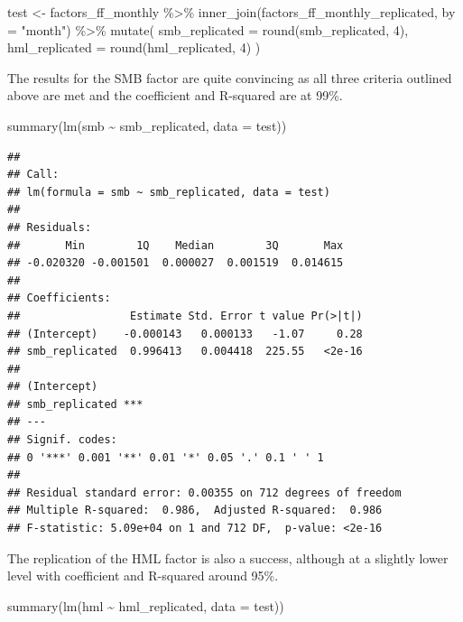 \documentclass[
]{krantz}
\newenvironment{Shaded}{\begin{snugshade}}{\end{snugshade}}
\newcommand{\AttributeTok}[1]{\textcolor[rgb]{0.61,0.61,0.61}{#1}}
\newcommand{\DecValTok}[1]{\textcolor[rgb]{0.06,0.06,0.06}{#1}}
\newcommand{\FunctionTok}[1]{\textcolor[rgb]{0,0,0}{#1}}
\newcommand{\NormalTok}[1]{#1}
\newcommand{\OtherTok}[1]{\textcolor[rgb]{0.37,0.37,0.37}{#1}}
\newcommand{\SpecialCharTok}[1]{\textcolor[rgb]{0,0,0}{#1}}
\newcommand{\StringTok}[1]{\textcolor[rgb]{0.5,0.5,0.5}{#1}}
\begin{document}
\begin{Shaded}
\begin{Highlighting}[]
\NormalTok{test }\OtherTok{\textless{}{-}}\NormalTok{ factors\_ff\_monthly }\SpecialCharTok{\%\textgreater{}\%}
  \FunctionTok{inner\_join}\NormalTok{(factors\_ff\_monthly\_replicated, }\AttributeTok{by =} \StringTok{"month"}\NormalTok{) }\SpecialCharTok{\%\textgreater{}\%}
  \FunctionTok{mutate}\NormalTok{(}
    \AttributeTok{smb\_replicated =} \FunctionTok{round}\NormalTok{(smb\_replicated, }\DecValTok{4}\NormalTok{),}
    \AttributeTok{hml\_replicated =} \FunctionTok{round}\NormalTok{(hml\_replicated, }\DecValTok{4}\NormalTok{)}
\NormalTok{  )}
\end{Highlighting}
\end{Shaded}

The results for the SMB factor are quite convincing as all three criteria outlined above are met and the coefficient and R-squared are at 99\%.

\begin{Shaded}
\begin{Highlighting}[]
\FunctionTok{summary}\NormalTok{(}\FunctionTok{lm}\NormalTok{(smb }\SpecialCharTok{\textasciitilde{}}\NormalTok{ smb\_replicated, }\AttributeTok{data =}\NormalTok{ test))}
\end{Highlighting}
\end{Shaded}

\begin{verbatim}
## 
## Call:
## lm(formula = smb ~ smb_replicated, data = test)
## 
## Residuals:
##       Min        1Q    Median        3Q       Max 
## -0.020320 -0.001501  0.000027  0.001519  0.014615 
## 
## Coefficients:
##                 Estimate Std. Error t value Pr(>|t|)
## (Intercept)    -0.000143   0.000133   -1.07     0.28
## smb_replicated  0.996413   0.004418  225.55   <2e-16
##                   
## (Intercept)       
## smb_replicated ***
## ---
## Signif. codes:  
## 0 '***' 0.001 '**' 0.01 '*' 0.05 '.' 0.1 ' ' 1
## 
## Residual standard error: 0.00355 on 712 degrees of freedom
## Multiple R-squared:  0.986,  Adjusted R-squared:  0.986 
## F-statistic: 5.09e+04 on 1 and 712 DF,  p-value: <2e-16
\end{verbatim}

The replication of the HML factor is also a success, although at a slightly lower level with coefficient and R-squared around 95\%.

\begin{Shaded}
\begin{Highlighting}[]
\FunctionTok{summary}\NormalTok{(}\FunctionTok{lm}\NormalTok{(hml }\SpecialCharTok{\textasciitilde{}}\NormalTok{ hml\_replicated, }\AttributeTok{data =}\NormalTok{ test))}
\end{Highlighting}
\end{Shaded}
\end{document}
